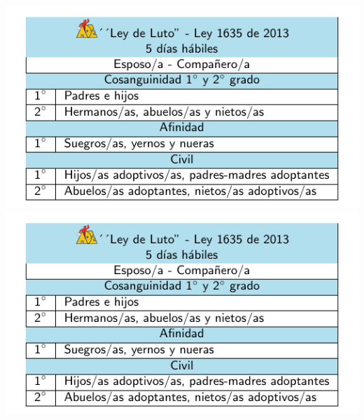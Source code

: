\documentclass[10pt,letterpaper]{minimal}
\begin{document}
\begin{center}
\pagebreak
\hspace{.5mm}\includegraphics[scale=1]{Tarjeta2.pdf} \includegraphics[scale=1]{Tarjeta2.pdf} \vspace{1.1mm}


\end{center}
\end{document}
